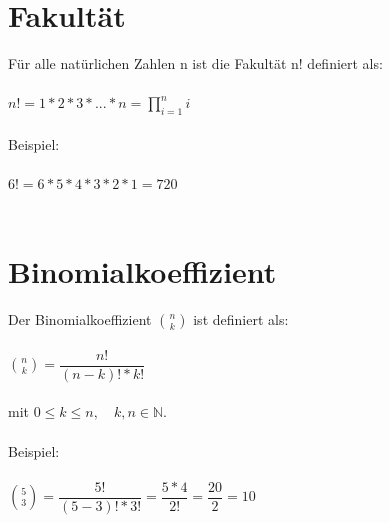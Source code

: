 \newpage

\section{Fakultät}
Für alle natürlichen Zahlen n ist die Fakultät n! definiert als:\\ \\
$ n! = 1 * 2 * 3 * ... * n = \prod \limits_{i = 1}^{n}i$\\ \\
Beispiel:\\ \\
$6! = 6 * 5 * 4 * 3 * 2 * 1 = 720$ \\ \\

\section{Binomialkoeffizient}
Der Binomialkoeffizient $\binom{n}{k}$ ist definiert als:\\ \\
$\binom{n}{k} = \dfrac{n!}{(n - k)! * k!}$\\ \\
mit $0 \le k \le n,\quad k, n \in \mathbb{N}$.\\ \\
Beispiel:\\ \\
$\binom{5}{3} = \dfrac{5!}{(5 - 3)! * 3!} = \dfrac{5 * 4}{2!} = \dfrac{20}{2} = 10$\\ \\

